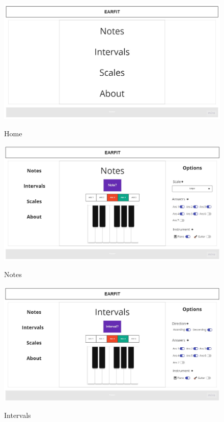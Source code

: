 \documentclass[12pt,twoside,titlepage]{report}
\begin{document}
{\begin{figure}[H]
    \centering
    \includegraphics[scale=0.3]{Design Thinking/Prototipo/Large/Menu}
    \label{fig:MenuLarge}
    \caption{Home}
\end{figure}

\begin{figure}[H]
    \centering
    \includegraphics[scale=0.29]{Design Thinking/Prototipo/Large/Notes}
    \label{fig:NotesLarge}
    \caption{Notes}
\end{figure}

\begin{figure}[H]
    \centering
    \includegraphics[scale=0.29]{Design Thinking/Prototipo/Large/Intervals}
    \label{fig:IntervalsLarge}
    \caption{Intervals}
\end{figure}

}
\end{document}

